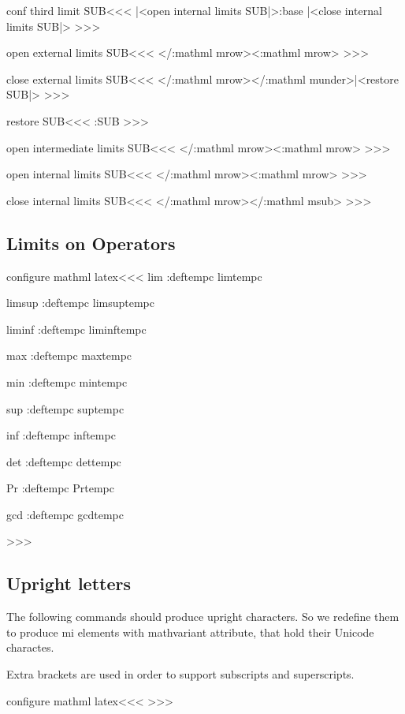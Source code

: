 {{{{{{\<conf third limit SUB\><<<
   {|<open internal limits SUB|>\bgroup \trap:base}
   {\egroup |<close internal limits SUB|>}%
>>>


\<open external limits SUB\><<<
%
\Tg</\a:mathml mrow>\Tg<\a:mathml mrow\Hnewline>%
>>>

\<close external limits SUB\><<<
\Tg</\a:mathml mrow>\TG</\a:mathml
              munder\Hnewline>\aftergroup|<restore SUB|>%
>>>

\<restore SUB\><<<
\pl:SUB >>>

\<open intermediate limits SUB\><<<
%
\Tg</\a:mathml mrow>\Tg<\a:mathml mrow\Hnewline>%
>>>

\<open internal limits SUB\><<<
%
\Tg</\a:mathml mrow>\Tg<\a:mathml mrow\Hnewline>%
>>>

\<close internal limits SUB\><<<
\Tg</\a:mathml mrow>\TG</\a:mathml msub\Hnewline>%
>>>

\subsection{Limits on Operators}


\<configure mathml latex\><<<
\def\:tempb#1{%
   \expandafter\let\expandafter\:tempc\csname #1\endcsname
   \append:def\:tempc{\limits}%
   \expandafter\HLet\csname #1\endcsname\:tempc
}
\:tempb{lim}
\:tempb{limsup}
\:tempb{liminf}
\:tempb{max}
\:tempb{min}
\:tempb{sup}
\:tempb{inf}
\:tempb{det}
\:tempb{Pr}
\:tempb{gcd}
>>>

\subsection{Upright letters}

The following commands should produce upright characters. So we redefine them
to produce mi elements with mathvariant attribute, that hold their Unicode
charactes.

Extra brackets are used in order to support subscripts and superscripts.

\<configure mathml latex\><<<
\def\:temp#1#2{\def#1{\PauseMathClass{\HCode{<mi mathvariant="normal">}\ht:special{t4ht@+\string&{35}x#2{59}}\a:HChar\HCode{</mi>}}\EndPauseMathClass}}
\:temp\Psi{03A8}
\:temp\Delta{0394}
\:temp\Xi{039E}
\:temp\Pi{03A0}
\:temp\Sigma{03A3}
\:temp\Upsilon{03A5}
\:temp\Omega{03A9}
>>>



}}}}}}
